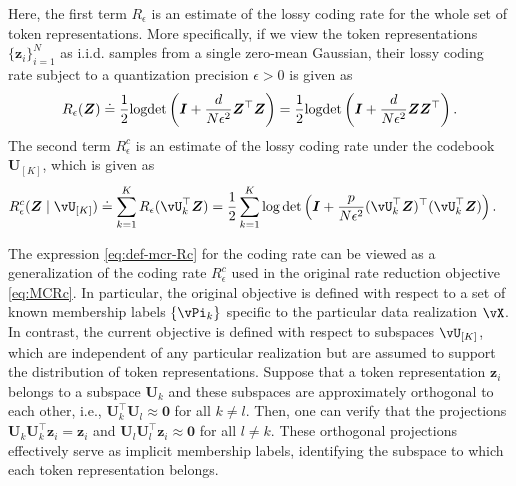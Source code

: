 \documentclass[../../book-main.tex]{subfiles}
\begin{document}
Here, the first term $R_{\epsilon}$ is an estimate of the lossy coding rate for the whole set of token representations. More specifically, if we view the token representations $\{\bm z_i\}_{i=1}^N$ as i.i.d. samples from a single zero-mean Gaussian, their lossy coding rate subject to a quantization precision $\epsilon > 0$ is given as
\begin{equation}\label{eq:coding_rate}
    R_{\epsilon}(\bm{Z}) \doteq \frac{1}{2}\textrm{logdet}\left(\bm{I} + \frac{d}{N\epsilon^{2}}\bm{Z}^{\top}\bm{Z}\right) = \frac{1}{2}\textrm{logdet}\left(\bm{I} + \frac{d}{N\epsilon^{2}}\bm{Z}\bm{Z}^{\top}\right).
\end{equation}
The second term $R_{\epsilon}^c$ is an estimate of the lossy coding rate under the codebook $\bm U_{[K]}$, which is given as 
\begin{equation}
\begin{aligned}
    R_{\epsilon}^c(\Z \mid \vU_{[K]}) &\doteq \sum_{k=1}^{K}R_{\epsilon}(\vU_k^{\top} \Z) = \frac{1}{2}\sum_{k=1}^{K}\log\det\left(\I +
    \frac{p}{N\epsilon^{2}}(\vU_k^{\top}\Z)^{\top}(\vU_k^{\top}\Z)\right).
\end{aligned}
\label{eq:def-mcr-Rc}
\end{equation}

\begin{remark}
    The expression \eqref{eq:def-mcr-Rc} for the coding rate can be viewed as a generalization of the coding rate \(R_\epsilon^{c}\) used in the original rate reduction objective \eqref{eq:MCRc}. In particular, the original objective is defined with respect to a set of known membership labels \(\{\vPi_{k}\}\) specific to the particular data realization \(\vX\). In contrast, the current objective is defined with respect to subspaces \(\vU_{[K]}\), which are independent of any particular realization but are assumed to support the distribution of token representations. Suppose that a token representation $\bm z_i$ belongs to a subspace $\bm U_k$ and these subspaces are approximately orthogonal to each other, i.e., $\bm U_k^\top \bm U_l \approx \bm 0$ for all $k \neq l$. Then, one can verify that the projections $\bm U_k\bm U_k^\top \bm z_i  = \bm z_i$ and  $\bm U_l\bm U_l^\top \bm z_i \approx \bm 0$ for all $l \neq k$. These orthogonal projections effectively serve as implicit membership labels, identifying the subspace to which each token representation belongs. 
\end{remark}
\end{document}
